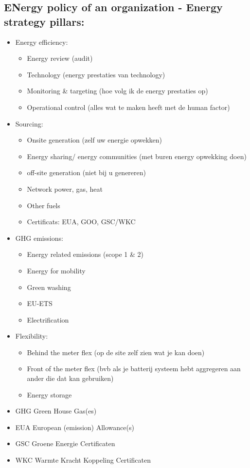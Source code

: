 \documentclass[12pt]{article}
\begin{document}
\subsection{ENergy policy of an organization - Energy strategy pillars:}
\begin{itemize}
    \item Energy efficiency:\begin{itemize}
        \item Energy review (audit)
        \item Technology (energy prestaties van technology)
        \item Monitoring \& targeting (hoe volg ik de energy prestaties op)
        \item Operational control (alles wat te maken heeft met de human factor)
    \end{itemize}
    \item Sourcing:\begin{itemize}
        \item Onsite generation (zelf uw energie opwekken)
        \item Energy sharing/ energy communities (met buren energy opwekking doen)
        \item off-site generation (niet bij u genereren)
        \item Network power, gas, heat
        \item Other fuels 
        \item Certificats: EUA, GOO, GSC/WKC
    \end{itemize} 
    \item GHG emissions:\begin{itemize}
        \item Energy related emissions (scope 1 \& 2)
        \item Energy for mobility 
        \item Green washing 
        \item EU-ETS 
        \item Electrification
    \end{itemize}
    \item Flexibility:\begin{itemize}
        \item Behind the meter flex (op de site zelf zien wat je kan doen)
        \item Front of the meter flex (bvb als je batterij systeem hebt aggregeren aan ander die dat kan gebruiken)
        \item Energy storage
    \end{itemize}
\end{itemize}
\begin{itemize}
    \item GHG Green House Gas(es)
    \item EUA European (emission) Allowance(s)
    \item GSC Groene Energie Certificaten
    \item WKC Warmte Kracht Koppeling Certificaten
\end{itemize}
\end{document}

